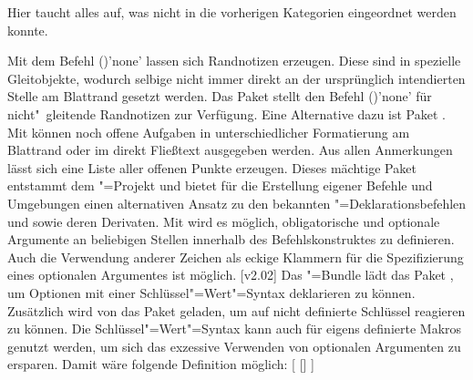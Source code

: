 Hier taucht alles auf, was nicht in die vorherigen Kategorien eingeordnet 
werden konnte.

\begin{DeclarePackages}
  Mit dem Befehl ()'none' lassen sich 
  Randnotizen erzeugen. Diese sind in  spezielle Gleitobjekte, 
  wodurch selbige nicht immer direkt an der ursprünglich intendierten Stelle am 
  Blattrand gesetzt werden. Das Paket  stellt den Befehl 
  ()'none' für nicht"~gleitende 
  Randnotizen zur Verfügung. Eine Alternative dazu ist Paket .
  Mit  können noch offene Aufgaben in unterschiedlicher 
  Formatierung am Blattrand oder im direkt Fließtext ausgegeben werden. Aus 
  allen Anmerkungen lässt sich eine Liste aller offenen Punkte erzeugen.
  Dieses mächtige Paket entstammt dem "=Projekt und bietet für 
  die Erstellung eigener Befehle und Umgebungen einen alternativen Ansatz zu 
  den bekannten "=Deklarationsbefehlen  und 
   sowie deren Derivaten. Mit  wird es 
  möglich, obligatorische und optionale Argumente an beliebigen Stellen 
  innerhalb des Befehlskonstruktes zu definieren. Auch die Verwendung anderer 
  Zeichen als eckige Klammern für die Spezifizierung eines optionalen 
  Argumentes ist möglich.
[v2.02]
  Das \KOMAScript"=Bundle lädt das Paket , um Optionen mit 
  einer Schlüssel"=Wert"=Syntax deklarieren zu können. Zusätzlich wird von 
  \TUDScript das Paket  geladen, um auf nicht definierte 
  Schlüssel reagieren zu können. Die Schlüssel"=Wert"=Syntax kann auch für 
  eigens definierte Makros genutzt werden, um sich das exzessive Verwenden von 
  optionalen Argumenten zu ersparen. Damit wäre folgende Definition möglich:
  [%
    []%
  ]
  

\end{DeclarePackages}
